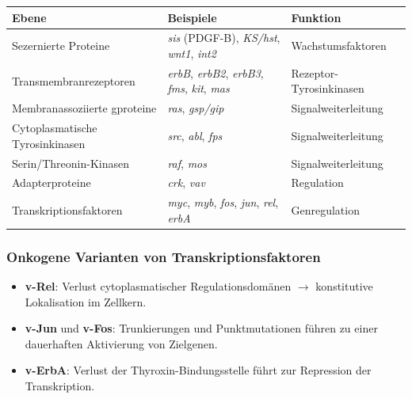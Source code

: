 \begin{table}[h]
    \centering
    \begin{tabular}{p{3.8cm}p{5cm}p{4cm}}
        \hline
        \textbf{Ebene} & \textbf{Beispiele} & \textbf{Funktion} \\
        \hline
        Sezernierte Proteine &
        \textit{sis} (PDGF-B), \textit{KS/hst}, \textit{wnt1}, \textit{int2}
        &
        Wachstumsfaktoren
        \\

        Transmembranrezeptoren &
        \textit{erbB}, \textit{erbB2}, \textit{erbB3}, \textit{fms}, \textit{kit}, \textit{mas}
        &
        Rezeptor-Tyrosinkinasen
        \\

        Membranassoziierte \gls{gprotein}e &
        \textit{ras}, \textit{gsp/gip} &
        Signalweiterleitung \\

        Cytoplasmatische Tyrosinkinasen &
        \textit{src}, \textit{abl}, \textit{fps} &
        Signalweiterleitung \\

        Serin/Threonin-Kinasen &
        \textit{raf}, \textit{mos} &
        Signalweiterleitung \\

        Adapterproteine &
        \textit{crk}, \textit{vav} &
        Regulation \\

        Transkriptionsfaktoren &
        \textit{myc}, \textit{myb}, \textit{fos}, \textit{jun},
        \textit{rel}, \textit{erbA} &
        Genregulation \\
        \hline
    \end{tabular}\label{tab:table10}
\end{table}

\subsubsection*{Onkogene Varianten von Transkriptionsfaktoren}

\begin{itemize}
    \item \textbf{v-Rel}: Verlust cytoplasmatischer Regulationsdomänen $\rightarrow$ konstitutive Lokalisation im Zellkern.
    \item \textbf{v-Jun} und \textbf{v-Fos}: Trunkierungen und Punktmutationen führen zu einer dauerhaften Aktivierung von Zielgenen.
    \item \textbf{v-ErbA}: Verlust der Thyroxin-Bindungsstelle führt zur Repression der Transkription.
\end{itemize}

